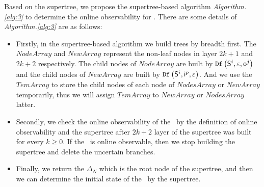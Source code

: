 Based on the supertree, we propose the supertree-based algorithm {\em Algorithm.\ref{alg:3}} to determine the online observability for \BCNs. There are some details of {\em Algorithm.\ref{alg:3}} are as follows:
\begin{itemize}
\item Firstly, in the supertree-based algorithm we build trees by breadth first. The $NodeArray$ and $NewArray$ represent the non-leaf nodes in layer $2k+1$ and $2k+2$ respectively. The child nodes of $NodeArray$ are built by ${\tt Df}\left(\mathsf{S}^i,\varepsilon, \mathsf{o}^j\right)$ and the child nodes of $NewArray$ are built by ${\tt Df}\left(\mathsf{S}^i,\mathsf{i}^p,\varepsilon\right)$. And we use the $TemArray$ to store the child nodes of each node of $NodesArray$ or $NewArray$ temporarily, thus we will assign $TemArray$ to $NewArray$ or $NodesArray$ latter.
\item Secondly, we check the online observability of the \BCN\ by the definition of online observability and the supertree after $2k+2$ layer of the supertree was built for every $k\ge0$. If the \BCN\ is online observable, then we stop building the supertree and delete the uncertain branches. 
\item Finally, we return the $\Delta_N$ which is the root node of the supertree, and then we can determine the initial state of the \BCN\ by the supertree.
 \end{itemize}
